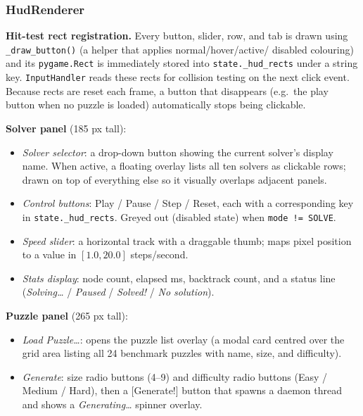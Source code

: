 \subsubsection{HudRenderer}

\textbf{Hit-test rect registration.} Every button, slider, row, and tab is
drawn using \texttt{\_draw\_button()} (a helper that applies normal/hover/active/
disabled colouring) and its \texttt{pygame.Rect} is immediately stored into
\texttt{state.\_hud\_rects} under a string key.
\texttt{InputHandler} reads these rects for collision testing on the next
click event.
Because rects are reset each frame, a button that disappears (e.g.\ the play
button when no puzzle is loaded) automatically stops being clickable.

\textbf{Solver panel} (185 px tall):
\begin{itemize}
  \item \emph{Solver selector}: a drop-down button showing the current
        solver's display name.
        When active, a floating overlay lists all ten solvers as clickable
        rows; drawn on top of everything else so it visually overlaps adjacent
        panels.
  \item \emph{Control buttons}: Play / Pause / Step / Reset, each with a
        corresponding key in \texttt{state.\_hud\_rects}.
        Greyed out (disabled state) when \texttt{mode != SOLVE}.
  \item \emph{Speed slider}: a horizontal track with a draggable thumb;
        maps pixel position to a value in $[1.0, 20.0]$ steps/second.
  \item \emph{Stats display}: node count, elapsed ms, backtrack count, and a
        status line (\emph{Solving\ldots} / \emph{Paused} / \emph{Solved!} /
        \emph{No solution}).
\end{itemize}

\textbf{Puzzle panel} (265 px tall):
\begin{itemize}
  \item \emph{Load Puzzle\ldots}: opens the puzzle list overlay (a modal card
        centred over the grid area listing all 24 benchmark puzzles with
        name, size, and difficulty).
  \item \emph{Generate}: size radio buttons (4–9) and difficulty radio buttons
        (Easy / Medium / Hard), then a [Generate!] button that spawns a daemon
        thread and shows a \emph{Generating\ldots} spinner overlay.
\end{itemize}

